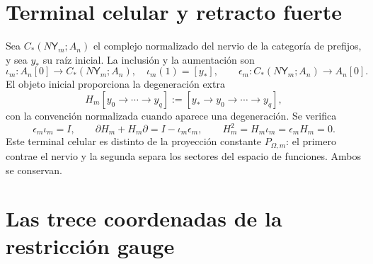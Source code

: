 \section{Terminal celular y retracto fuerte}

Sea \(C_*(N\mathsf Y_m;A_n)\) el complejo normalizado del nervio de la
categoría de prefijos, y sea \(y_*\) su raíz inicial. La inclusión y la
aumentación son
\[
 \iota_m:A_n[0]\longrightarrow C_*(N\mathsf Y_m;A_n),
 \quad \iota_m(1)=[y_*],
 \qquad
 \epsilon_m:C_*(N\mathsf Y_m;A_n)\longrightarrow A_n[0].
\]
El objeto inicial proporciona la degeneración extra
\begin{equation}\label{eq:gauint-homotopia-celular}
 H_m[y_0\to\cdots\to y_q]
 :=[y_*\to y_0\to\cdots\to y_q],
\end{equation}
con la convención normalizada cuando aparece una degeneración. Se verifica
\begin{equation}\label{eq:gauint-sdr}
 \epsilon_m\iota_m=I,
 \qquad
 \partial H_m+H_m\partial=I-\iota_m\epsilon_m,
 \qquad
 H_m^2=H_m\iota_m=\epsilon_mH_m=0.
\end{equation}
Este terminal celular es distinto de la proyección constante
\(P_{\Omega,m}\): el primero contrae el nervio y la segunda separa los
sectores del espacio de funciones. Ambos se conservan.

\iffalse
\section{Las trece coordenadas de la restricción gauge}

